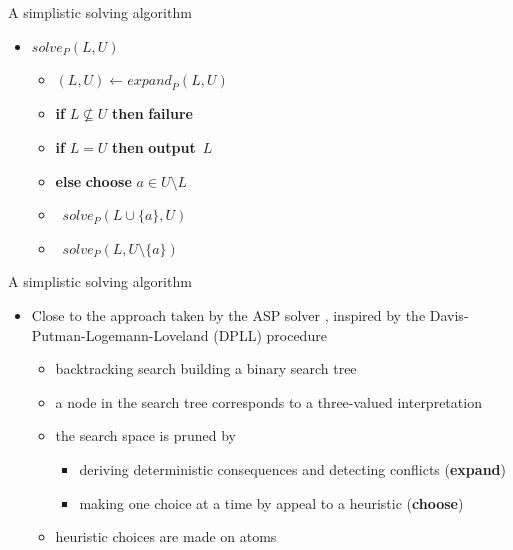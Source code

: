 \begin{frame}{A simplistic solving algorithm}
  \bigskip
  \begin{itemize}
  \item [] $\mathit{solve}_P(L,U)$
    \smallskip
    \begin{itemize}\normalsize
    \item [] $(L,U)\leftarrow\mathit{expand}_P(L,U)$                         \hfill{}
    \item [] \textbf{if} $L\not\subseteq U$ \textbf{then} \textbf{failure}   \hfill{}
    \item [] \textbf{if} $L =            U$ \textbf{then} \textbf{output}~$L$\hfill{}
    \item [] \textbf{else} \textbf{choose} $a\in U\setminus L$               \hfill{}
    \item [] \qquad\ $\mathit{solve}_P(L\cup\{a\},U              )$
    \item [] \qquad\ $\mathit{solve}_P(L,         U\setminus\{a\})$
    \end{itemize}
  \end{itemize}
\end{frame}
\begin{frame}{A simplistic solving algorithm}
\bigskip
\begin{itemize}
  \item Close to the approach taken by the ASP solver \smodels,
    inspired by the Davis-Putman-Logemann-Loveland (DPLL) procedure
    \smallskip
  \begin{itemize}\normalsize
  \item<2-> backtracking search building a binary search tree
  \item<2-> a node in the search tree corresponds to a three-valued interpretation
    \smallskip
  \item<3-> the search space is pruned by
    \begin{itemize}\normalsize
    \item deriving deterministic consequences and detecting conflicts (\textbf{expand})
    \item making one choice at a time by appeal to a heuristic (\textbf{choose})
    \end{itemize}
    \smallskip
  \item<4-> heuristic choices are made on atoms
  \end{itemize}
\end{itemize}
\end{frame}
%
